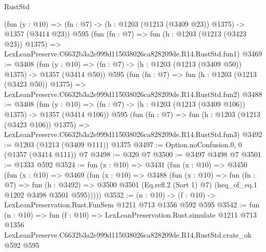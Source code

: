 \begin{lexlean}{RustStd}
\begin{coremodule}
    (fun (y : @10) => (fn : @7) -> (h : @1203 (@1213 (@3409 @23)) @1375) -> @1357 (@3414 @23))
    @595
    (fun (fn : @7) =>
    fun (h : @1203 (@1213 (@3423 @23)) @1375) =>
    LexLeanPreserve.C6632b3a2e999d115038026ca828209de.R14.RustStd.fun1)
@3469 := @3408
    (fun (y : @10) => (fn : @7) -> (h : @1203 (@1213 (@3409 @50)) @1375) -> @1357 (@3414 @50))
    @595
    (fun (fn : @7) =>
    fun (h : @1203 (@1213 (@3423 @50)) @1375) =>
    LexLeanPreserve.C6632b3a2e999d115038026ca828209de.R14.RustStd.fun2)
@3488 := @3408
    (fun (y : @10) => (fn : @7) -> (h : @1203 (@1213 (@3409 @106)) @1375) -> @1357 (@3414 @106))
    @595
    (fun (fn : @7) =>
    fun (h : @1203 (@1213 (@3423 @106)) @1375) =>
    LexLeanPreserve.C6632b3a2e999d115038026ca828209de.R14.RustStd.fun3)
@3492 := @1203 (@1213 (@3409 @111)) @1375
@3497 := Option.noConfusion.{0, 0} (@1357 (@3414 @111)) @7
@3498 := @320 @7
@3500 := @3497 @3498 @7
@3501 := @1333 @592
@3524 := fun (x : @10) =>
  @3431
    (fun (x : @10) =>
    @3450
      (fun (x : @10) =>
      @3469
        (fun (x : @10) =>
        @3488
          (fun (x : @10) =>
          fun (fn : @7) =>
          fun (h : @3492) =>
          @3500 @3501 (Eq.refl.{2} (Sort 1) @7) (heq_of_eq.{1} @1202 @3498 @3501 @595)))))
@3532 := (n : @10) -> (f : @10) -> LexLeanPreservation.Rust.FunSem @1211 @713 @1356 @592 @595
@3542 := fun (n : @10) =>
  fun (f : @10) =>
  LexLeanPreservation.Rust.simulate
    @1211
    @713
    @1356
    LexLeanPreserve.C6632b3a2e999d115038026ca828209de.R14.RustStd.crate_ok
    @592
    @595
\end{coremodule}
\end{lexlean}
